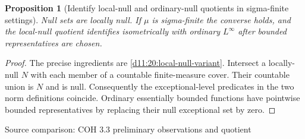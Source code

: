 \documentclass[11pt,oneside,openany]{book}
\newtheorem{proposition}[theorem]{Proposition}
\theoremstyle{definition}
\theoremstyle{remark}
\newcommand{\family}[1]{}
\newcommand{\source}[1]{\par\begingroup\small\sffamily\color{black!65}Source comparison: #1\par\endgroup}
\begin{document}
\begin{proposition}[Identify local-null and ordinary-null quotients in sigma-finite settings]\family{D11.20.local_null_sigmafinite_bridge}\label{d11:20:local-null-sigmafinite-bridge}
Null sets are locally null. If $\mu$ is sigma-finite the converse holds, and the local-null quotient identifies isometrically with ordinary $L^\infty$ after bounded representatives are chosen.
\end{proposition}
\begin{proof}
The precise ingredients are \cref{d11:20:local-null-variant}. Intersect a locally-null $N$ with each member of a countable finite-measure cover. Their countable union is $N$ and is null. Consequently the exceptional-level predicates in the two norm definitions coincide. Ordinary essentially bounded functions have pointwise bounded representatives by replacing their null exceptional set by zero.
\end{proof}
\source{COH 3.3 preliminary observations and quotient}
\end{document}
